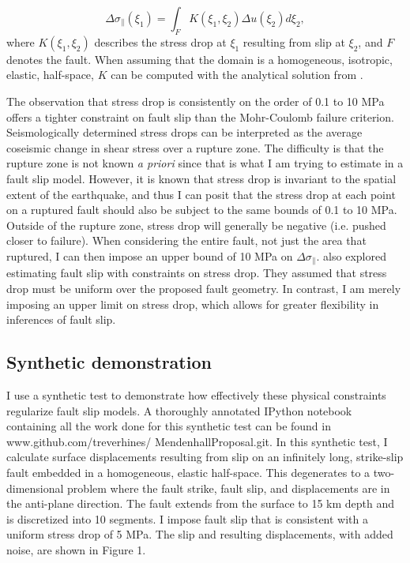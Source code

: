 \documentclass[12pt]{article}
\begin{document}
\begin{equation}\label{eq:StressSlip}
  \Delta \sigma_\parallel (\xi_1) = \int_F K(\xi_1,\xi_2) \Delta u(\xi_2) d\xi_2,
\end{equation}
where $K(\xi_1,\xi_2)$ describes the stress drop at $\xi_1$ resulting from slip at $\xi_2$, and $F$ denotes the fault.  When assuming that the domain is a homogeneous, isotropic, elastic, half-space, $K$ can be computed with the analytical solution from \citet{Okada1992}.  

The observation that stress drop is consistently on the order of 0.1 to 10 MPa offers a tighter constraint on fault slip than the Mohr-Coulomb failure criterion.  Seismologically determined stress drops can be interpreted as the average coseismic change in shear stress over a rupture zone.  The difficulty is that the rupture zone is not known \textit{a priori} since that is what I am trying to estimate in a fault slip model.  However, it is known that stress drop is invariant to the spatial extent of the earthquake, and thus I can posit that the stress drop at each point on a ruptured fault should also be subject to the same bounds of 0.1 to 10 MPa.  Outside of the rupture zone, stress drop will generally be negative (i.e. pushed closer to failure).  When considering the entire fault, not just the area that ruptured, I can then impose an upper bound of 10 MPa on $\Delta \sigma_\parallel$.  \citet{Sun2011} also explored estimating fault slip with constraints on stress drop.  They assumed that stress drop must be uniform over the proposed fault geometry.  In contrast, I am merely imposing an upper limit on stress drop, which allows for greater flexibility in inferences of fault slip.        

\subsection*{Synthetic demonstration}
I use a synthetic test to demonstrate how effectively these physical constraints regularize fault slip models.  A thoroughly annotated IPython notebook containing all the work done for this synthetic test can be found in www.github.com/treverhines/ MendenhallProposal.git.  In this synthetic test, I calculate surface displacements resulting from slip on an infinitely long, strike-slip fault embedded in a homogeneous, elastic half-space.  This degenerates to a two-dimensional problem where the fault strike, fault slip, and displacements are in the anti-plane direction.  The fault extends from the surface to 15 km depth and is discretized into 10 segments. I impose fault slip that is consistent with a uniform stress drop of 5 MPa.  The slip and resulting displacements, with added noise, are shown in Figure 1.
\end{document}
